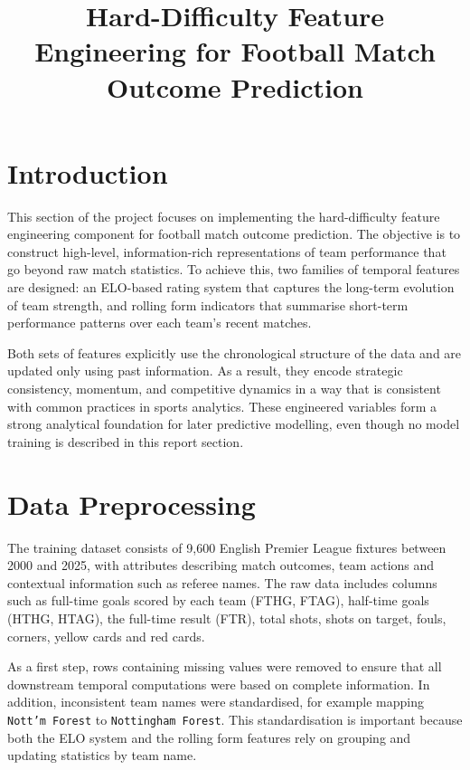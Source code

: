 \documentclass[11pt,a4paper]{article}
\title{Hard-Difficulty Feature Engineering for Football Match Outcome Prediction}
\author{}
\date{}
\begin{document}
\maketitle

\onehalfspacing

\section{Introduction}

This section of the project focuses on implementing the hard-difficulty feature engineering component for football match outcome prediction. The objective is to construct high-level, information-rich representations of team performance that go beyond raw match statistics. To achieve this, two families of temporal features are designed: an ELO-based rating system that captures the long-term evolution of team strength, and rolling form indicators that summarise short-term performance patterns over each team’s recent matches. 

Both sets of features explicitly use the chronological structure of the data and are updated only using past information. As a result, they encode strategic consistency, momentum, and competitive dynamics in a way that is consistent with common practices in sports analytics. These engineered variables form a strong analytical foundation for later predictive modelling, even though no model training is described in this report section.

\section{Data Preprocessing}

The training dataset consists of 9,600 English Premier League fixtures between 2000 and 2025, with attributes describing match outcomes, team actions and contextual information such as referee names. The raw data includes columns such as full-time goals scored by each team (FTHG, FTAG), half-time goals (HTHG, HTAG), the full-time result (FTR), total shots, shots on target, fouls, corners, yellow cards and red cards.

As a first step, rows containing missing values were removed to ensure that all downstream temporal computations were based on complete information. In addition, inconsistent team names were standardised, for example mapping \texttt{Nott'm Forest} to \texttt{Nottingham Forest}. This standardisation is important because both the ELO system and the rolling form features rely on grouping and updating statistics by team name.
\end{document}
